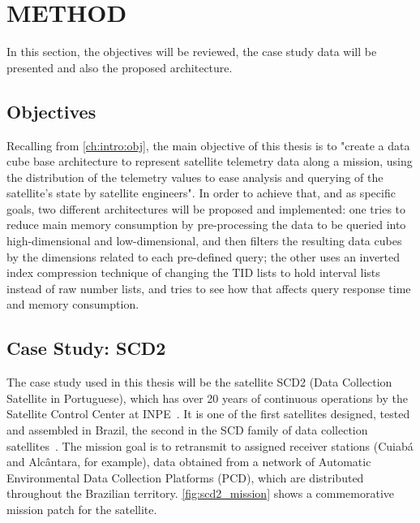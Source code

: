 
\chapter{METHOD}\label{ch:prop}

In this section, the objectives will be reviewed, the case study data will be presented and also the proposed architecture.

\section{Objectives}\label{ch:prop:obj}

Recalling from \autoref{ch:intro:obj}, the main objective of this thesis is to "create a data cube base architecture to represent satellite telemetry data along a mission, using the distribution of the telemetry values to ease analysis and querying of the satellite's state by satellite engineers".
In order to achieve that, and as specific goals, two different architectures will be proposed and implemented: one tries to reduce main memory consumption by pre-processing the data to be queried into high-dimensional and low-dimensional, and then filters the resulting data cubes by the dimensions related to each pre-defined query; the other uses an inverted index compression technique of changing the TID lists to hold interval lists instead of raw number lists, and tries to see how that affects query response time and memory consumption.

\section{Case Study: SCD2}\label{ch:prop:scd2}

The case study used in this thesis will be the satellite SCD2 (Data Collection Satellite in Portuguese), which has over 20 years of continuous operations by the Satellite Control Center at INPE~\cite{OrlandoKuga:2007:SaSCSC}.
It is one of the first satellites designed, tested and assembled in Brazil, the second in the SCD family of data collection satellites~\cite{Oliveira:1996:SC1Sa}.
The mission goal is to retransmit to assigned receiver stations (Cuiabá and Alcântara, for example), data obtained from a network of Automatic Environmental Data Collection Platforms (PCD), which are distributed throughout the Brazilian territory.
\autoref{fig:scd2_mission} shows a commemorative mission patch for the satellite.

